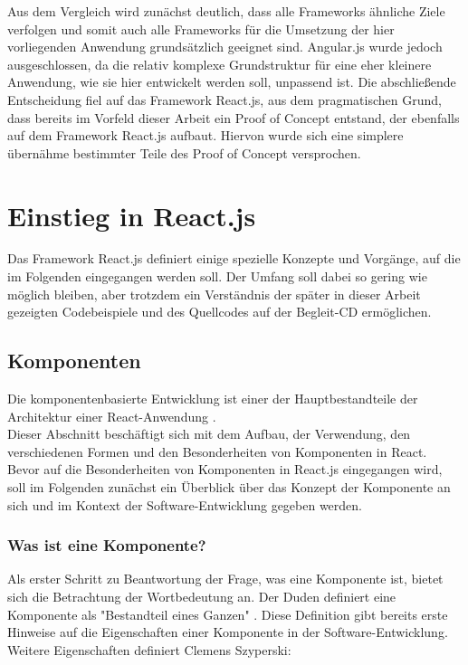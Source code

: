 Aus dem Vergleich wird zunächst deutlich, dass alle Frameworks ähnliche Ziele verfolgen und somit auch alle Frameworks für die Umsetzung der hier vorliegenden Anwendung grundsätzlich geeignet sind.
Angular.js wurde jedoch ausgeschlossen, da die relativ komplexe Grundstruktur für eine eher kleinere Anwendung, wie sie hier entwickelt werden soll, unpassend ist.
Die abschließende Entscheidung fiel auf das Framework React.js, aus dem pragmatischen Grund, dass bereits im Vorfeld dieser Arbeit ein Proof of Concept entstand, der ebenfalls auf dem Framework React.js aufbaut. Hiervon wurde sich eine simplere übernähme bestimmter Teile des Proof of Concept versprochen.


\section{Einstieg in React.js}
Das Framework React.js definiert einige spezielle Konzepte und Vorgänge, auf die im Folgenden eingegangen werden soll. Der Umfang soll dabei so gering wie möglich bleiben, aber trotzdem ein Verständnis der später in dieser Arbeit gezeigten Codebeispiele und des Quellcodes auf der Begleit-CD ermöglichen.

\subsection{Komponenten}
Die komponentenbasierte Entwicklung ist einer der Hauptbestandteile der Architektur einer React-Anwendung \cite[S. 28]{Gackenheimer201509}. \\
Dieser Abschnitt beschäftigt sich mit dem Aufbau, der Verwendung, den verschiedenen Formen und den Besonderheiten von Komponenten in React.\\
Bevor auf die Besonderheiten von Komponenten in React.js eingegangen wird, soll im Folgenden zunächst ein Überblick über das Konzept der Komponente an sich und im Kontext der Software-Entwicklung gegeben werden.

\subsubsection{Was ist eine Komponente?}
\label{chap:component}
Als erster Schritt zu Beantwortung der Frage, was eine Komponente ist, bietet sich die Betrachtung der Wortbedeutung an. Der Duden definiert eine Komponente als "Bestandteil eines Ganzen" \cite{Dudenredaktion2006}. Diese Definition gibt bereits erste Hinweise auf die Eigenschaften einer Komponente in der Software-Entwicklung.\\
Weitere Eigenschaften definiert Clemens Szyperski:

